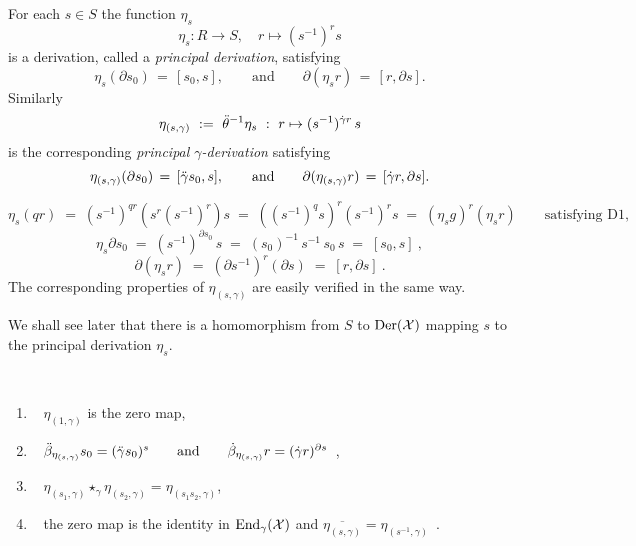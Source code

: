 \begin{lem} \label{lem:gamma-eta_s}
For each $s \in S$ the function $\eta_s$ 
$$
\eta_s : R \to S, \quad r \mapsto (s^{-1})^r s 
$$  
is a derivation, 
  
called a \emph{principal derivation}, satisfying   
$$
\eta_s(\partial s_0) \,=\, [s_0,s], 
\qquad\mbox{and}\qquad 
\partial(\eta_s r) \,=\, [r, \partial s].
$$ 
Similarly 
$$
\eta_{(s,\gamma)} ~:=~ \ddot{\theta}^{-1}\eta_s  ~:~ r \mapsto (s^{-1})^{\dot{\gamma} r}\,s
$$
is the corresponding \emph{principal $\gamma$-derivation} satisfying 
$$
\eta_{(s,\gamma)} (\partial s_0) \,=\, [\ddot{\gamma} s_0,s], 
\qquad\mbox{and}\qquad 
\partial(\eta_{(s,\gamma)} r) \,=\, [\dot{\gamma} r, \partial s].
$$
\end{lem}
\begin{pf} 
$$
\eta_s(qr) 
  \;=\;  (s^{-1})^{qr} (s^r(s^{-1})^r) s 
  \;=\;  ((s^{-1})^qs)^r (s^{-1})^r s 
  \;=\;  (\eta_sg)^r (\eta_sr) \qquad\mbox{satisfying D1}, 
$$
$$
\eta_s \partial s_0 \;=\; (s^{-1})^{\partial s_0}\,s 
                    \;=\; (s_0)^{-1}\,s^{-1}\,s_0\,s
                    \;=\; [s_0,s]~,
$$
$$
\partial(\eta_s r)  \;=\; (\partial s^{-1})^r (\partial s) 
                    \;=\; [r, \partial s]~.
$$
The corresponding properties of $\eta_{(s,\gamma)}$ are easily verified in the same way. 
\end{pf}

\medskip
We shall see later that there is a homomorphism from $S$ to $\mathrm{Der}(\mathcal{X})$ 
mapping $s$ to the principal derivation $\eta_s$. 


\begin{lem} \label{lem:princ-prop}
\mbox{}\\
\vspace{-5mm}
\begin{enumerate}[{\rm (a)}]
\item~
$\eta_{(1,\gamma)}$ is the zero map,
\item~
$\ddot{\beta}_{\eta_{(s,\gamma)}}s_0 = (\ddot{\gamma} s_0)^s 
\qquad\mbox{and}\qquad
\dot{\beta}_{\eta_{(s,\gamma)}}r = (\dot{\gamma} r)^{\partial s}$~,
\item~
$\eta_{(s_1,\gamma)} \star_{\gamma} \eta_{(s_2,\gamma)} = \eta_{(s_1s_2,\gamma)}$, 
\item~
the zero map is the identity in $\mathrm{End}_{\gamma}(\mathcal{X})$ and 
$\overline{\eta_{(s,\gamma)}} = \eta_{(s^{-1},\gamma)}$~.
\end{enumerate}
\end{lem} 

